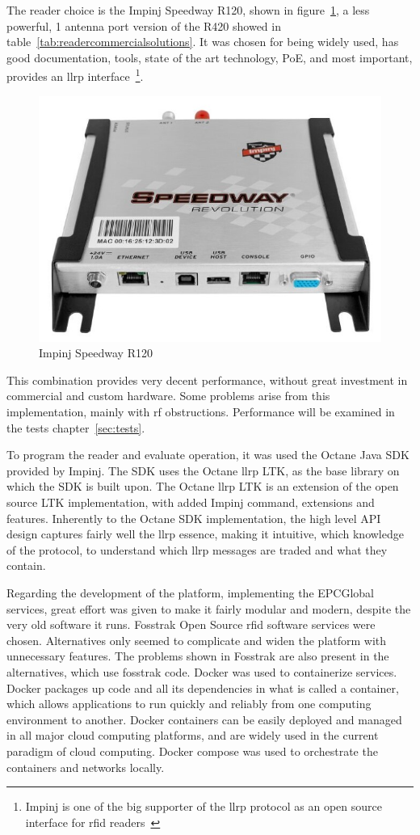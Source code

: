 The reader choice is the Impinj Speedway R120, shown in figure~\ref{fig:impinjr120}, a less powerful, 1 antenna port version of the R420 showed in table~\ref{tab:readercommercialsolutions}. It was chosen for being widely used, has good documentation, tools, state of the art technology, PoE, and most important, provides an \ac{llrp} interface~\footnote{Impinj is one of the big supporter of the \ac{llrp} protocol as an open source interface for \ac{rfid} readers~\cite{SevenRFIDOrganizations}}.

\begin{figure}
    \centering
    \includegraphics[width=0.6\linewidth]{./figs/Speedway_Revolution_R120.jpg}
    \caption{Impinj Speedway R120~\cite{ImpinjSolucoesRAIN}} 
    \label{fig:impinjr120}
\end{figure}

This combination provides very decent performance, without great investment in commercial and custom hardware. Some problems arise from this implementation, mainly with \ac{rf} obstructions. Performance will be examined in the tests chapter~\ref{sec:tests}.  

To program the reader and evaluate operation, it was used the Octane Java SDK provided by Impinj. 
The SDK uses the Octane \ac{llrp} LTK, as the base library on which the SDK is built upon. The Octane \ac{llrp} LTK is an extension of the open source LTK implementation, with added Impinj command, extensions and features.
Inherently to the Octane SDK implementation, the high level API design captures fairly well the \ac{llrp} essence, making it intuitive, which knowledge of the protocol, to understand which \ac{llrp} messages are traded and what they contain.

Regarding the development of the platform, implementing the EPCGlobal services, great effort was given to make it fairly modular and modern, despite the very old software it runs.
Fosstrak Open Source \ac{rfid} software services were chosen. Alternatives only seemed to complicate and widen the platform with unnecessary features. The problems shown in Fosstrak are also present in the alternatives, which use fosstrak code.
Docker was used to containerize services. 
Docker packages up code and all its dependencies in what is called a container, which allows applications to run quickly and reliably from one computing environment to another. Docker containers can be easily deployed and managed in all major cloud computing platforms, and are widely used in the current paradigm of cloud computing.
Docker compose was used to orchestrate the containers and networks locally.
